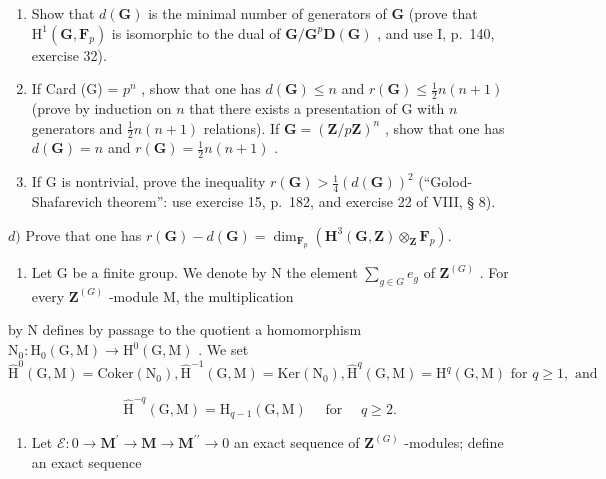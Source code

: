\begin{enumerate}
\def\labelenumi{\alph{enumi})}
\item
  Show that \(d(\mathbf{G})\) is the minimal number of generators of \(\mathbf{G}\) (prove that \(\mathrm{H}^1 (\mathbf{G},\mathbf{F}_p)\) is isomorphic to the dual of \(\mathbf{G} / \mathbf{G}^p\mathbf{D}(\mathbf{G})\) , and use I, p.~140, exercise 32).
\item
  If Card (G) = \(p^n\) , show that one has \(d(\mathbf{G}) \leqslant n\) and \(r(\mathbf{G}) \leqslant \frac{1}{2} n(n + 1)\) (prove by induction on \(n\) that there exists a presentation of G with \(n\) generators and \(\frac{1}{2} n(n + 1)\) relations). If \(\mathbf{G} = (\mathbf{Z}/p\mathbf{Z})^n\) , show that one has \(d(\mathbf{G}) = n\) and \(r(\mathbf{G}) = \frac{1}{2} n(n + 1)\) .
\item
  If G is nontrivial, prove the inequality \(r(\mathbf{G}) > \frac{1}{4}(d(\mathbf{G}))^{2}\) (“Golod-Shafarevich theorem”: use exercise 15, p.~182, and exercise 22 of VIII, § 8).
\end{enumerate}

\(d)\) Prove that one has \(r(\mathbf{G}) - d(\mathbf{G}) = \dim_{\mathbf{F}_p}(\mathbf{H}^3 (\mathbf{G},\mathbf{Z})\otimes_{\mathbf{Z}}\mathbf{F}_p).\)

\begin{enumerate}
\def\labelenumi{\arabic{enumi})}
\setcounter{enumi}{16}
\tightlist
\item
  Let G be a finite group. We denote by N the element \(\sum_{g\in G}e_g\) of \(\mathbf{Z}^{(G)}\) . For every \(\mathbf{Z}^{(G)}\) -module M, the multiplication
\end{enumerate}

by N defines by passage to the quotient a homomorphism \(\mathrm{N}_{0}:\mathrm{H}_{0}(\mathrm{G},\mathrm{M})\to\mathrm{H}^{0}(\mathrm{G},\mathrm{M})\) . We set \(\hat{\mathrm{H}}^{0}(\mathrm{G},\mathrm{M})=\mathrm{Coker}(\mathrm{N}_{0}),\hat{\mathrm{H}}^{-1}(\mathrm{G},\mathrm{M})=\mathrm{Ker}(\mathrm{N}_{0}),\hat{\mathrm{H}}^{q}(\mathrm{G},\mathrm{M})=\mathrm{H}^{q}(\mathrm{G},\mathrm{M})\text{ for } q\geqslant1,\text{ and}\)

\[
\hat {\mathrm{H}} ^ {- q} (\mathrm{G}, \mathrm{M}) = \mathrm{H} _ {q - 1} (\mathrm{G}, \mathrm{M}) \quad \text { for } \quad q \geqslant 2.
\]

\begin{enumerate}
\def\labelenumi{\alph{enumi})}
\tightlist
\item
  Let \(\mathcal{E}:0\to\mathbf{M}^{\prime}\to\mathbf{M}\to\mathbf{M}^{\prime\prime}\to0\) an exact sequence of \(\mathbf{Z}^{(G)}\) -modules; define an exact sequence
\end{enumerate}

